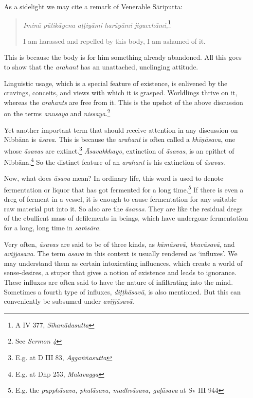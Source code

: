 As a sidelight we may cite a remark of Venerable Sāriputta:

\begin{quote}
\emph{Iminā pūtikāyena aṭṭiyāmi harāyāmi jigucchāmi,}\footnote{A IV 377, \emph{Sīhanādasutta}}

I am harassed and repelled by this body, I am ashamed of it.
\end{quote}

This is because the body is for him something already abandoned. All this goes to show that the \emph{arahant} has an unattached, unclinging attitude.

Linguistic usage, which is a special feature of existence, is enlivened by the cravings, conceits, and views with which it is grasped. Worldlings thrive on it, whereas the \emph{arahants} are free from it. This is the upshot of the above discussion on the terms \emph{anusaya} and \emph{nissaya}.\footnote{See \emph{Sermon 4}}

Yet another important term that should receive attention in any discussion on Nibbāna is \emph{āsava}. This is because the \emph{arahant} is often called a \emph{khīṇāsava}, one whose \emph{āsavas} are extinct.\footnote{E.g. at D III 83, \emph{Aggaññasutta}} \emph{Āsavakkhayo}, extinction of \emph{āsavas}, is an epithet of Nibbāna.\footnote{E.g. at Dhp 253, \emph{Malavagga}} So the distinct feature of an \emph{arahant} is his extinction of \emph{āsavas}.

Now, what does \emph{āsava} mean? In ordinary life, this word is used to denote fermentation or liquor that has got fermented for a long time.\footnote{E.g. the \emph{pupphāsava, phalāsava, madhvāsava, guḷāsava} at Sv III 944} If there is even a dreg of ferment in a vessel, it is enough to cause fermentation for any suitable raw material put into it. So also are the \emph{āsavas}. They are like the residual dregs of the ebullient mass of defilements in beings, which have undergone fermentation for a long, long time in \emph{saṁsāra}.

Very often, \emph{āsavas} are said to be of three kinds, as \emph{kāmāsavā, bhavāsavā}, and \emph{avijjāsavā}. The term \emph{āsava} in this context is usually rendered as `influxes'. We may understand them as certain intoxicating influences, which create a world of sense-desires, a stupor that gives a notion of existence and leads to ignorance. These influxes are often said to have the nature of infiltrating into the mind. Sometimes a fourth type of influxes, \emph{diṭṭhāsavā}, is also mentioned. But this can conveniently be subsumed under \emph{avijjāsavā}.

